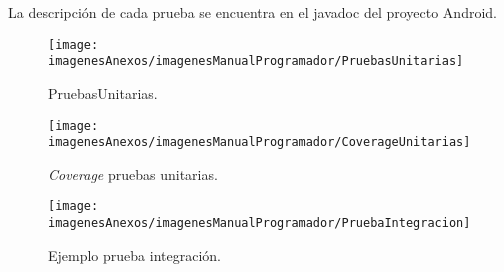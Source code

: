 La descripción de cada prueba se encuentra en el javadoc del proyecto Android.

\begin{figure}[h]
    \begin{center}%
        \begin{center}%
          \texttt{[image: imagenesAnexos/imagenesManualProgramador/PruebasUnitarias]}%
          \caption{PruebasUnitarias.}%
          \label{figPruebasUnitarias}%
        \end{center}%
  	\end{center}%
\end{figure}%

\begin{figure}[h]
    \begin{center}%
        \begin{center}%
          \texttt{[image: imagenesAnexos/imagenesManualProgramador/CoverageUnitarias]}%
          \caption{\textit{Coverage} pruebas unitarias.}%
          \label{figCoverageUnitarias}%
        \end{center}%
  	\end{center}%
\end{figure}%

\begin{figure}[h]
    \begin{center}%
        \begin{center}%
          \texttt{[image: imagenesAnexos/imagenesManualProgramador/PruebaIntegracion]}%
          \caption{Ejemplo prueba integración.}%
          \label{figPruebaIntegracion}%
        \end{center}%
  	\end{center}%
\end{figure}%